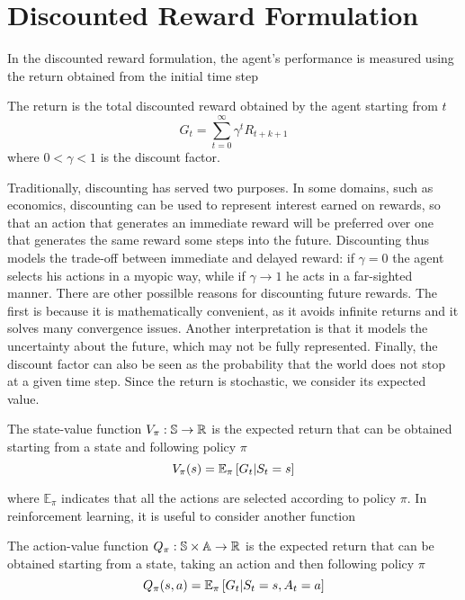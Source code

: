 \section{Discounted Reward Formulation}
In the discounted reward formulation, the agent's performance is measured using
the return obtained from the initial time step
\begin{definition}[Return]
	The return is the total discounted reward obtained by the agent starting 
	from $t$  
	\begin{equation}
		G_t = \sum^{\infty}_{t=0} \gamma^t R_{t+k+1} 
	\end{equation}
	where $0 < \gamma < 1$ is the discount factor.
\end{definition}
Traditionally, discounting has served two purposes. In some domains, such as
economics, discounting can be used to represent interest earned on rewards, so
that an action that generates an immediate reward will be preferred over one
that generates the same reward some steps into the future. Discounting thus
models the trade-off between immediate and delayed reward: if $\gamma = 0$ the
agent selects his actions in a myopic way, while if $\gamma \to 1$ he acts in a
far-sighted manner. There are other possilble reasons for discounting future
rewards. The first is because it is mathematically convenient, as it avoids
infinite returns and it solves many convergence issues. Another interpretation
is that it models the uncertainty about the future, which may not be fully
represented. Finally, the discount factor can also be seen as the probability
that the world does not stop at a given time step. Since the return is
stochastic, we consider its expected value.  
\begin{definition}
	The state-value function $V_\pi: \S \to \R$ is the expected return that can
	be obtained starting from a state and following policy $\pi$
	\begin{equation}
		V_\pi(s) = \E[\pi]{G_t|S_t = s}
	\end{equation}
\end{definition}
where $\mathbb{E}_{\pi}$ indicates that all the actions are selected according
to policy $\pi$. In reinforcement learning, it is useful to consider another
function 
\begin{definition}
	The action-value function $Q_\pi: \S \times \A \to \R$ is the expected 
	return that can be obtained starting from a state, taking an action and
	then following policy $\pi$
	\begin{equation}
		Q_\pi(s,a) = \E[\pi]{G_t|S_t = s, A_t = a}
	\end{equation}
\end{definition}
